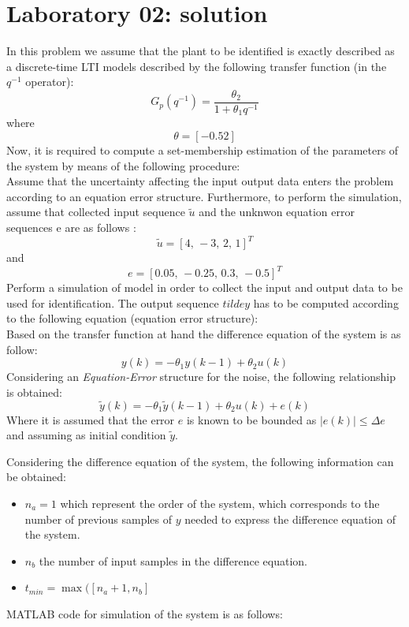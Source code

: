 \chapter{Laboratory 02: solution}

In this problem we assume that the plant to be identified is exactly described as a discrete-time
LTI models described by the following transfer function (in the \(q^{-1}\) operator):
\[
G_p(q^{-1}) = \frac {\theta_2}{1 + \theta_1q^{-1}}
\]
where
\[
\theta = \left[-0.5 2 \right]
\]
Now, it is required to compute a set-membership estimation of the parameters of the system by means of the following procedure:\\
Assume that the uncertainty affecting the input output data enters the problem according to an equation error structure. Furthermore, to perform the simulation, assume that collected input sequence \(\tilde{u}\) and the unknwon equation error sequences e are as follows :
\[
\tilde{u} = \left[4,\,-3,\,2,\, 1 \right]^T
\]
and
\[
e = \left[0.05,\,-0.25,\,0.3,\,-0.5 \right]^T
\]
Perform a simulation of model in order to collect the input and output data to be used for identification. The output sequence \(tilde{y}\) has to be computed according to the following equation (equation error structure):\\
Based on the transfer function at hand the difference equation of the system is as follow:
\[
y(k) = -\theta_1y(k-1) + \theta_2u(k)
\]
Considering an \textit{Equation-Error} structure for the noise, the following relationship is obtained:
\[
\tilde{y}(k) = -\theta_1 \tilde{y}(k-1) + \theta_2u(k) + e(k)
\]
Where it is assumed that the error \(e\) is known to be bounded as \(|e(k)|\leq \Delta e\) and assuming as initial condition \(\tilde{y}\).

Considering the difference equation of the system, the following information can be obtained:\\
\begin{itemize}
\item \(n_a = 1\) which represent the order of the system, which corresponds to the number of previous samples of \(y\) needed to express the difference equation of the system.
\item \(n_b\) the number of input samples in the difference equation.
\item \(t_{min} = \max(\left[n_a +1, n_b\right]\)
\end{itemize}
MATLAB code for simulation of the system is as follows:

